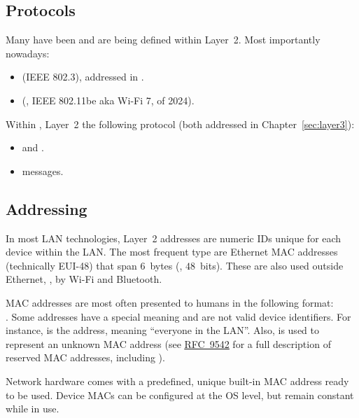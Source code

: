 \vspace{-0.25cm}
\subsection*{Protocols}
Many  have been and are being defined within Layer~2. Most importantly nowadays:\\[-0.6cm]
\begin{itemize}
\item {} (IEEE 802.3), addressed in .
\item {} (\eg, IEEE 802.11be aka Wi-Fi 7, of 2024).
\end{itemize}

Within , Layer~2  the following protocol 
(both addressed in Chapter~\ref{sec:layer3}):\\[-0.6cm]
\begin{itemize}
  \item {} and  .
  \item {} messages.\\[-0.75cm]
\end{itemize}

\subsection*{Addressing}
In most LAN technologies, Layer~2 addresses are numeric IDs unique for each device within the LAN. 
The most frequent type are Ethernet MAC addresses (technically EUI-48) that span $6$~bytes (\ie, $48$~bits).
These are also used outside Ethernet, \eg, by Wi-Fi and Bluetooth.

MAC addresses are most often presented to humans in the following format:\\.
Some addresses have a special meaning and are not valid device identifiers.
For instance,  is the  address, meaning ``everyone in the LAN''. 
% 
Also,  is used to represent an unknown MAC address
% 
(see \href{https://www.iana.org/assignments/ethernet-numbers/ethernet-numbers.xml}{\underline{RFC~9542}} 
for a full description of reserved MAC addresses, including ).

Network hardware comes with a predefined, unique built-in MAC address ready to be used.
Device MACs can be configured at the OS level, but remain constant while in use.

